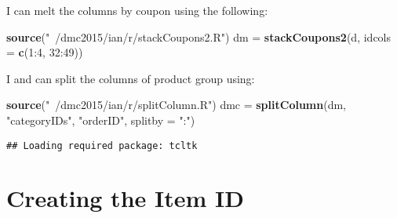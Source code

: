 \documentclass[10pt]{report}
\newenvironment{Shaded}{}{}
\newcommand{\KeywordTok}[1]{\textcolor[rgb]{0.00,0.44,0.13}{\textbf{{#1}}}}
\newcommand{\DataTypeTok}[1]{\textcolor[rgb]{0.56,0.13,0.00}{{#1}}}
\newcommand{\DecValTok}[1]{\textcolor[rgb]{0.25,0.63,0.44}{{#1}}}
\newcommand{\StringTok}[1]{\textcolor[rgb]{0.25,0.44,0.63}{{#1}}}
\newcommand{\NormalTok}[1]{{#1}}
\begin{document}
I can melt the columns by coupon using the following:

\begin{Shaded}
\begin{Highlighting}[]
\KeywordTok{source}\NormalTok{(}\StringTok{"~/dmc2015/ian/r/stackCoupons2.R"}\NormalTok{)}
\NormalTok{dm =}\StringTok{ }\KeywordTok{stackCoupons2}\NormalTok{(d, }\DataTypeTok{idcols =} \KeywordTok{c}\NormalTok{(}\DecValTok{1}\NormalTok{:}\DecValTok{4}\NormalTok{, }\DecValTok{32}\NormalTok{:}\DecValTok{49}\NormalTok{))}
\end{Highlighting}
\end{Shaded}

I and can split the columns of product group using:

\begin{Shaded}
\begin{Highlighting}[]
\KeywordTok{source}\NormalTok{(}\StringTok{"~/dmc2015/ian/r/splitColumn.R"}\NormalTok{)}
\NormalTok{dmc =}\StringTok{ }\KeywordTok{splitColumn}\NormalTok{(dm, }\StringTok{"categoryIDs"}\NormalTok{, }\StringTok{"orderID"}\NormalTok{, }\DataTypeTok{splitby =} \StringTok{":"}\NormalTok{)}
\end{Highlighting}
\end{Shaded}

\begin{verbatim}
## Loading required package: tcltk
\end{verbatim}

\section{Creating the Item ID}\label{creating-the-item-id}

\begin{Shaded}
\end{Shaded}
\end{document}
